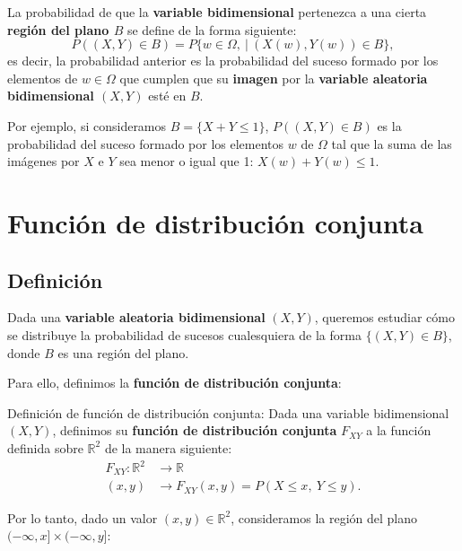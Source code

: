 \documentclass[]{book}
\begin{document}
La probabilidad de que la \textbf{variable bidimensional} pertenezca a una cierta \textbf{región del plano \(B\)} se define de la forma siguiente:
\[
P((X,Y)\in B)=P\{w\in \Omega,\ |\ (X(w),Y(w))\in B\},
\]
es decir, la probabilidad anterior es la probabilidad del suceso formado por los elementos de \(w\in\Omega\) que cumplen que su \textbf{imagen} por la \textbf{variable aleatoria bidimensional \((X,Y)\)} esté en \(B\).

Por ejemplo, si consideramos \(B=\{X+Y\leq 1\}\), \(P((X,Y)\in B)\) es la probabilidad del suceso formado por los elementos \(w\) de \(\Omega\) tal que la suma de las imágenes por \(X\) e \(Y\) sea menor o igual que 1: \(X(w)+Y(w)\leq 1\).

\hypertarget{funciuxf3n-de-distribuciuxf3n-conjunta}{%
\section{Función de distribución conjunta}\label{funciuxf3n-de-distribuciuxf3n-conjunta}}

\hypertarget{definiciuxf3n-1}{%
\subsection{Definición}\label{definiciuxf3n-1}}

Dada una \textbf{variable aleatoria bidimensional} \((X,Y)\), queremos estudiar cómo se distribuye la probabilidad de sucesos cualesquiera de la forma \(\{(X,Y)\in B\}\), donde \(B\) es una región del plano.

Para ello, definimos la \textbf{función de distribución conjunta}:

Definición de función de distribución conjunta:
Dada una variable bidimensional \((X,Y)\), definimos su \textbf{función de distribución conjunta} \(F_{XY}\) a la función definida sobre \(\mathbb{R}^2\) de la manera siguiente:
\[
\begin{array}{rl}
F_{XY}: \mathbb{R}^2 & \longrightarrow \mathbb{R}\\
(x,y) & \longrightarrow F_{XY}(x,y)=P(X\leq x,\ Y\leq y).
\end{array}
\]

Por lo tanto, dado un valor \((x,y)\in \mathbb{R}^2\), consideramos la región del plano \((-\infty,x]\times (-\infty,y]\):
\end{document}
